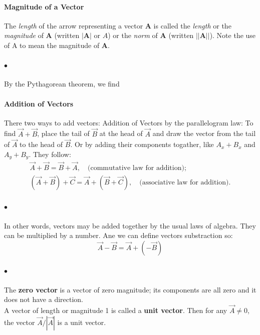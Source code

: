            \paragraph{Magnitude of a Vector} The \textit{length} of the arrow representing a vector $\textbf{A}$
            is called the \textit{length} or the \textit{magnitude} of \textbf{A} (written $|\textbf{A}|$ or $A$) or
            the \textit{norm} of \textbf{A} (written $||\textbf{A}||$). Note the use of A to mean the magnitude of \textbf{A}.

            \paragraph{$\bullet$} By the Pythagorean theorem, we find

            \paragraph{Addition of Vectors} There two ways to add vectors: 
            Addition of Vectors
            by the parallelogram law: To find $\vec{A} + \vec{B}$, place the tail of 
            $\vec{B}$ at the head of $\vec{A}$ and draw the vector from the tail of $\vec{A}$ to the head of $\vec{B}$.
            Or by adding their components togather, like $A_x + B_x$ and $A_y + B_y$. They follow:
            \begin{align} \label{vectors properties}
                \vec{A} + \vec{B} = \vec{B} + \vec{A}, \quad \text{(commutative law for addition)};\\
                (\vec{A} + \vec{B}) + \vec{C} = \vec{A} + (\vec{B} + \vec{C}), \quad \text{(associative law for addition)}.
            \end{align}
            \paragraph{$\bullet$} In other words, vectors may be added together by the usual laws of algebra.
            They can be multiplied by a number. Ane we can define vectors substraction so:
            $$ \vec{A} - \vec{B} = \vec{A} + (-\vec{B}) $$

            \paragraph{$\bullet$} The \textbf{zero vector} is a vector of zero magnitude; its 
            components are all zero and it does not have a direction.\\
            A vector of length or magnitude 1 is called a \textbf{unit vector}. 
            Then for any $\vec{A} \neq 0$, the vector $\vec{A}/|\vec{A}|$ is a unit vector.

